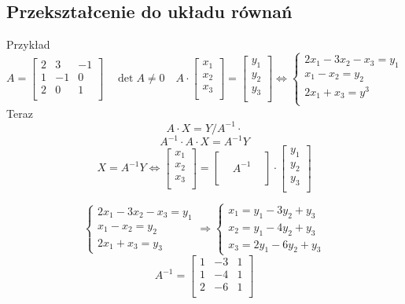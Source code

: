 \documentclass[11pt]{article}
\begin{document}
\subsection{Przekształcenie do układu równań}
Przykład $ A = \begin{bmatrix}
	2 & 3 & -1\\
	1 & -1 & 0\\
2 & 0 & 1\\
\end{bmatrix} \quad
\det{A} \not = 0 \quad A \cdot \begin{bmatrix}
	x_1\\
	x_2\\
	x_3\\
\end{bmatrix} = \begin{bmatrix}
	y_1\\
	y_2\\
	y_3\\
\end{bmatrix} \iff \begin{cases} 2x_1 - 3x_2 - x_3 = y_1 \\ x_1 - x_2 = y_2 \\ 2x_1 + x_3 = y^3\\ \end{cases}$
Teraz 
$$ A \cdot X = Y / A^{-1} \cdot $$ 
$$ A^{-1} \cdot A \cdot X = A^{-1} Y $$
$$ X = A^{-1} Y \iff \begin{bmatrix}
	x_1\\
	x_2\\
	x_3\\
\end{bmatrix} = \begin{bmatrix}
	 &  & \\
	 & A^{-1} & \\
	 &  & \\
\end{bmatrix} \cdot \begin{bmatrix}
	y_1\\
	y_2\\
	y_3\\
\end{bmatrix}$$

$$ \begin{cases} 2x_1 - 3x_2 - x_3 = y_1 \\ x_1 - x_2 = y_2 \\ 2x_1 + x_3 = y_3 \end{cases} \Rightarrow \begin{cases} x_1 = y_1 - 3y_2 + y_3 \\ x_2 = y_1 - 4y_2 + y_3 \\ x_3  = 2y_1 - 6y_2 + y_3 \end{cases} $$
$$ A^{-1} = \begin{bmatrix}
	1 & -3 & 1\\
	1 & -4 & 1\\
	2 & -6 & 1\\
\end{bmatrix}$$
\end{document}
